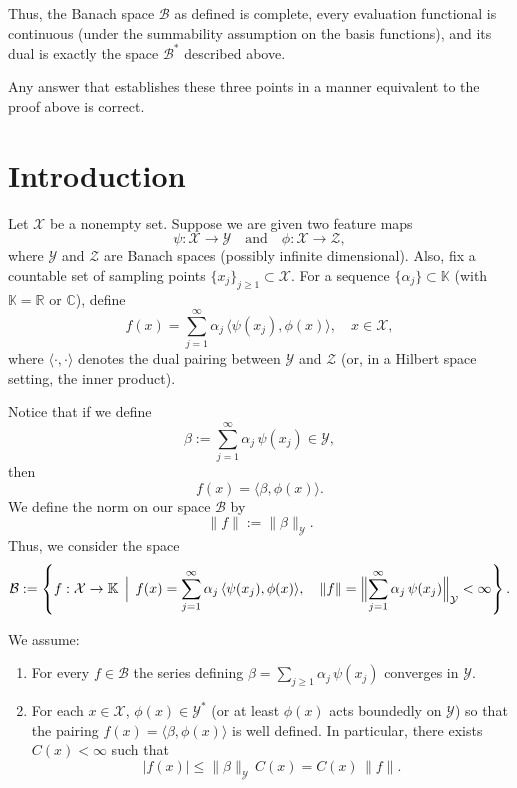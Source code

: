 Thus, the Banach space \(\mathcal{B}\) as defined is complete, every evaluation functional is continuous (under the summability assumption on the basis functions), and its dual is exactly the space \(\mathcal{B}^*\) described above.

Any answer that establishes these three points in a manner equivalent to the proof above is correct.

\newpage

\section*{Introduction}

Let $\mathcal{X}$ be a nonempty set. Suppose we are given two feature maps
\[
\psi:\mathcal{X}\to \mathcal{Y} \quad \text{and} \quad \phi:\mathcal{X}\to \mathcal{Z},
\]
where $\mathcal{Y}$ and $\mathcal{Z}$ are Banach spaces (possibly infinite dimensional). Also, fix a countable set of sampling points $\{x_j\}_{j\ge1}\subset \mathcal{X}$. For a sequence $\{\alpha_j\}\subset \mathbb{K}$ (with $\mathbb{K}=\mathbb{R}$ or $\mathbb{C}$), define
\[
f(x)= \sum_{j=1}^\infty \alpha_j\, \langle \psi(x_j), \phi(x)\rangle, \quad x\in \mathcal{X},
\]
where $\langle \cdot,\cdot\rangle$ denotes the dual pairing between $\mathcal{Y}$ and $\mathcal{Z}$ (or, in a Hilbert space setting, the inner product).

Notice that if we define
\[
\beta := \sum_{j=1}^\infty \alpha_j\, \psi(x_j)\in \mathcal{Y},
\]
then
\[
f(x)= \langle \beta, \phi(x) \rangle.
\]
We define the norm on our space $\mathcal{B}$ by
\[
\|f\| := \|\beta\|_{\mathcal{Y}}.
\]
Thus, we consider the space
\[
\mathcal{B} := \left\{ f:\mathcal{X}\to \mathbb{K}\,\Bigm|\, f(x)= \sum_{j=1}^\infty \alpha_j\, \langle \psi(x_j), \phi(x)\rangle,\quad \|f\| = \Bigl\|\sum_{j=1}^\infty \alpha_j\, \psi(x_j)\Bigr\|_{\mathcal{Y}} < \infty \right\}.
\]

We assume:
\begin{enumerate}
  \item For every $f\in\mathcal{B}$ the series defining $\beta=\sum_{j\ge1}\alpha_j\, \psi(x_j)$ converges in $\mathcal{Y}$.
  \item For each $x\in\mathcal{X}$, $\phi(x)\in \mathcal{Y}^*$ (or at least $\phi(x)$ acts boundedly on $\mathcal{Y}$) so that the pairing $f(x)=\langle \beta, \phi(x)\rangle$ is well defined. In particular, there exists $C(x)<\infty$ such that
  \[
  |f(x)| \le \|\beta\|_{\mathcal{Y}}\, C(x) = C(x)\,\|f\|.
  \]
\end{enumerate}

